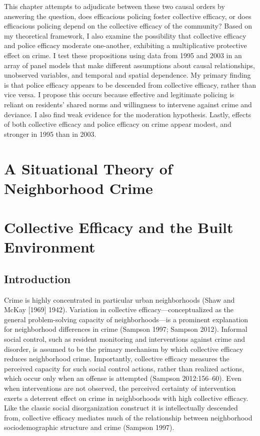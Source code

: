 \documentclass [11pt, proquest] {uwthesis}[2015/03/03]
\begin{document}
This chapter attempts to adjudicate between these two causal orders by answering the question, does efficacious policing foster collective efficacy, or does efficacious policing depend on the collective efficacy of the community? Based on my theoretical framework, I also examine the possibility that collective efficacy and police efficacy moderate one-another, exhibiting a multiplicative protective effect on crime. I test these propositions using data from 1995 and 2003 in an array of panel models that make different assumptions about causal relationships, unobserved variables, and temporal and spatial dependence. My primary finding is that police efficacy appears to be descended from collective efficacy, rather than vice versa. I propose this occurs because effective and legitimate policing is reliant on residents' shared norms and willingness to intervene against crime and deviance. I also find weak evidence for the moderation hypothesis. Lastly, effects of both collective efficacy and police efficacy on crime appear modest, and stronger in 1995 than in 2003.

\hypertarget{theory}{%
\chapter{A Situational Theory of Neighborhood Crime}\label{theory}}

\hypertarget{builtenvironment}{%
\chapter{Collective Efficacy and the Built Environment}\label{builtenvironment}}

\hypertarget{introduction-1}{%
\section{Introduction}\label{introduction-1}}

\noindent Crime is highly concentrated in particular urban neighborhoods (Shaw and McKay {[}1969{]} 1942). Variation in collective efficacy---conceptualized as the general problem-solving capacity of neighborhoods---is a prominent explanation for neighborhood differences in crime (Sampson 1997; Sampson 2012). Informal social control, such as resident monitoring and interventions against crime and disorder, is assumed to be the primary mechanism by which collective efficacy reduces neighborhood crime. Importantly, collective efficacy measures the perceived capacity for such social control actions, rather than realized actions, which occur only when an offense is attempted (Sampson 2012:156--60). Even when interventions are not observed, the perceived certainty of intervention exerts a deterrent effect on crime in neighborhoods with high collective efficacy. Like the classic social disorganization construct it is intellectually descended from, collective efficacy mediates much of the relationship between neighborhood sociodemographic structure and crime (Sampson 1997).
\end{document}
